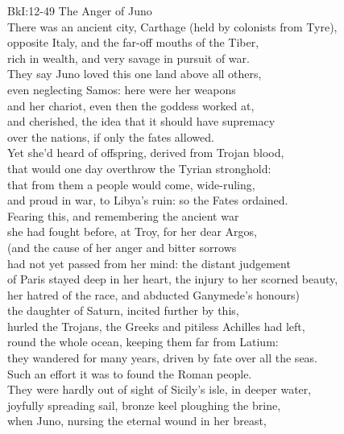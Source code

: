 \documentclass[12pt, a5paper, titlepage]{letter}
\begin{document}
{BkI:12-49 The Anger of Juno}\\
There was an ancient city, Carthage (held by colonists from Tyre),\\
opposite Italy, and the far-off mouths of the Tiber,\\
rich in wealth, and very savage in pursuit of war.\\
They say Juno loved this one land above all others,\\
even neglecting Samos: here were her weapons\\
and her chariot, even then the goddess worked at,\\
and cherished, the idea that it should have supremacy\\
over the nations, if only the fates allowed.\\
Yet she'd heard of offspring, derived from Trojan blood,\\
that would one day overthrow the Tyrian stronghold:\\
that from them a people would come, wide-ruling,\\
and proud in war, to Libya's ruin: so the Fates ordained.\\
Fearing this, and remembering the ancient war\\
she had fought before, at Troy, for her dear Argos,\\
(and the cause of her anger and bitter sorrows\\
had not yet passed from her mind: the distant judgement\\
of Paris stayed deep in her heart, the injury to her scorned beauty,\\
her hatred of the race, and abducted Ganymede's honours)\\
the daughter of Saturn, incited further by this,\\
hurled the Trojans, the Greeks and pitiless Achilles had left,\\
round the whole ocean, keeping them far from Latium:\\
they wandered for many years, driven by fate over all the seas.\\
Such an effort it was to found the Roman people.\\
They were hardly out of sight of Sicily's isle, in deeper water,\\
joyfully spreading sail, bronze keel ploughing the brine,\\
when Juno, nursing the eternal wound in her breast,\\
\end{document}

